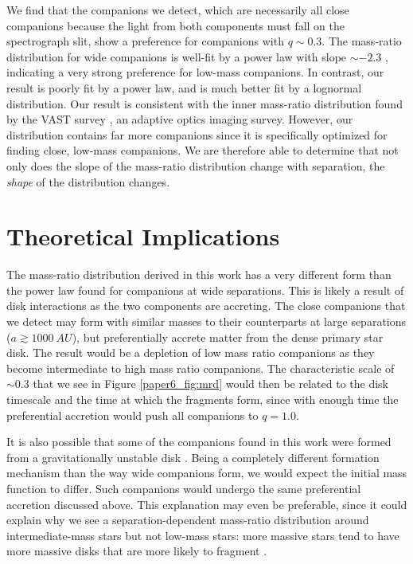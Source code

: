 \documentclass{utthesis}
\begin{document}
We find that the companions we detect, which are necessarily all close companions because the light from both components must fall on the spectrograph slit, show a preference for companions with $q \sim 0.3$. The mass-ratio distribution for wide companions is well-fit by a power law with slope $\sim -2.3$ \citep{DeRosa2014}, indicating a very strong preference for low-mass companions. In contrast, our result is poorly fit by a power law, and is much better fit by a lognormal distribution. Our result is consistent with the inner mass-ratio distribution found by the VAST survey \citep{DeRosa2014}, an adaptive optics imaging survey. However, our distribution contains far more companions since it is specifically optimized for finding close, low-mass companions. We are therefore able to determine that not only does the slope of the mass-ratio distribution change with separation, the \emph{shape} of the distribution changes.

\section{Theoretical Implications}

The mass-ratio distribution derived in this work has a very different form than the power law found for companions at wide separations. This is likely a result of disk interactions as the two components are accreting. The close companions that we detect may form with similar masses to their counterparts at large separations ($a \gtrsim 1000\ AU$), but preferentially accrete matter from the dense primary star disk. The result would be a depletion of low mass ratio companions as they become intermediate to high mass ratio companions. The characteristic scale of $\sim 0.3$ that we see in Figure \ref{paper6_fig:mrd} would then be related to the disk timescale and the time at which the fragments form, since with enough time the preferential accretion would push all companions to $q = 1.0$. 

It is also possible that some of the companions found in this work were formed from a gravitationally unstable disk \citep[e.g.][]{Kratter2006, Stamatellos2011}. Being a completely different formation mechanism than the way wide companions form, we would expect the initial mass function to differ. Such companions would undergo the same preferential accretion discussed above. This explanation may even be preferable, since it could explain why we see a separation-dependent mass-ratio distribution around intermediate-mass stars but not low-mass stars: more massive stars tend to have more massive disks \citep{Andrews2013} that are more likely to fragment \citep{Kratter2010}.
\end{document}
